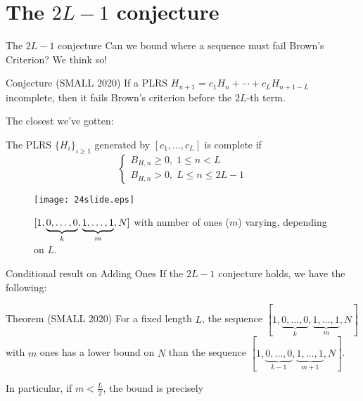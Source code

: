 \documentclass[handout]{beamer}
\begin{document}
\section{The $2L - 1$ conjecture}
\begin{frame}{The $2L - 1$ conjecture}
    Can we bound where a sequence must fail Brown's Criterion?
    \pause \alert{We think so!}
    \bigskip
    \begin{alertblock}{Conjecture (SMALL 2020)}
        If a PLRS $H_{n + 1} = c_1 H_n + \cdots + c_L H_{n + 1 - L}$ incomplete, then it fails Brown's criterion before the $2L$-th term.
    \end{alertblock}
\pause
The closest we've gotten:
\begin{theorem}[SMALL 2020]
    The PLRS $\{H_i\}_{i \ge 1}$ generated by $[c_1, \dots, c_L]$ is complete if $$\begin{cases} B_{H, n} \ge 0, \; 1 \le n < L \\ B_{H, n} > 0, \; L \le n \le 2L-1 \end{cases}$$
\end{theorem}
\end{frame}

\begin{frame}{}
\begin{figure}
    \centering
    \texttt{[image: 24slide.eps]}
    \caption{$[1,\protect\underbrace{0, \dots, 0}_{k}, \protect\underbrace{1, \dots, 1}_{m}, N]$ with number of ones ($m$) varying, depending on $L$.}
    \label{fig:LastOnes}
\end{figure}
\end{frame}

\begin{frame}{
    Conditional result on Adding Ones}
    If the $2L-1$ conjecture holds, we have the following:
    \begin{alertblock}{Theorem (SMALL 2020)}
For a fixed length $L$, the sequence $[1,\underbrace{0,\ldots, 0}_{k},\underbrace{1,\ldots,1}_{m},N]$ with $m$ ones has a lower bound on $N$ than the sequence $[1,\underbrace{0,\ldots, 0}_{k-1},\underbrace{1,\ldots,1}_{m+1},N]$.

In particular, if $m<\frac{L}{2}$, the bound is precisely
\begin{center}\end{center}
\end{alertblock}
\end{frame}
\end{document}
